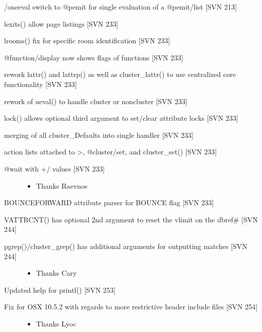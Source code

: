 \documentclass[letterpaper,10pt,english]{sphinxmanual}
\begin{document}
\sphinxAtStartPar
/oneeval switch to @pemit for single evaluation of a @pemit/list {[}SVN 213{]}

\sphinxAtStartPar
lexits() allow page listings {[}SVN 233{]}

\sphinxAtStartPar
lrooms() \sphinxhyphen{} fix for specific room identification {[}SVN 233{]}

\sphinxAtStartPar
@function/display now shows flags of functions {[}SVN 233{]}

\sphinxAtStartPar
rework lattr() and lattrp() as well as cluster\_lattr() to use centralized core functionality {[}SVN 233{]}

\sphinxAtStartPar
rework of ueval() to handle cluster or non\sphinxhyphen{}cluster {[}SVN 233{]}

\sphinxAtStartPar
lock() allows optional third argument to set/clear attribute locks {[}SVN 233{]}

\sphinxAtStartPar
merging of all cluster\_Defaults into single handler {[}SVN 233{]}

\sphinxAtStartPar
action lists attached to \textgreater{}, @cluster/set, and cluster\_set() {[}SVN 233{]}
\begin{description}
\item[{@wait with +/\sphinxhyphen{} values {[}SVN 233{]}}] \leavevmode\begin{itemize}
\item {} 
\sphinxAtStartPar
Thanks Raevnos

\end{itemize}

\end{description}

\sphinxAtStartPar
BOUNCEFORWARD attribute parser for BOUNCE flag {[}SVN 233{]}

\sphinxAtStartPar
VATTRCNT() has optional 2nd argument to reset the vlimit on the dbref\# {[}SVN 244{]}
\begin{description}
\item[{pgrep()/cluster\_grep() has additional arguments for outputting matches {[}SVN 244{]}}] \leavevmode\begin{itemize}
\item {} 
\sphinxAtStartPar
Thanks Cary

\end{itemize}

\end{description}

\sphinxAtStartPar
Updated help for printf() {[}SVN 253{]}
\begin{description}
\item[{Fix for OSX 10.5.2 with regards to more restrictive header include files {[}SVN 254{]}}] \leavevmode\begin{itemize}
\item {} 
\sphinxAtStartPar
Thanks Lyoc

\end{itemize}

\end{description}
\end{document}
